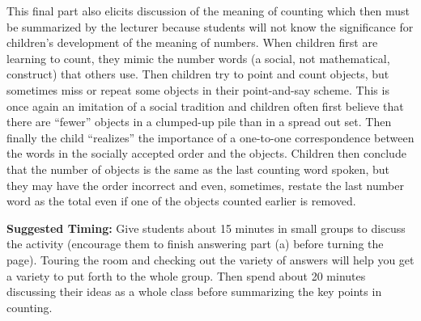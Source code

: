 \documentclass{ximera}
\begin{document}
\begin{instructorNotes}
This final part also elicits discussion of the meaning of counting which then must be summarized by the lecturer because students will not know the significance for children's development of the meaning of numbers.  When children first are learning to count, they mimic the number words (a social, not mathematical, construct) that others use.  Then children try to point and count objects, but sometimes miss or repeat some objects in their point-and-say scheme.  This is once again an imitation of a social tradition and children often first believe that there are ``fewer'' objects in a clumped-up pile than in a spread out set.  Then finally the child ``realizes'' the importance of a one-to-one correspondence between the words in the socially accepted order and the objects.  Children then conclude that the number of objects is the same as the last counting word spoken, but they may have the order incorrect and even, sometimes, restate the last number word as the total even if one of the objects counted earlier is removed.


{\bf Suggested Timing:} Give students about 15 minutes in small groups to discuss the activity (encourage them to finish answering part (a) before turning the page).  Touring the room and checking out the variety of answers will help you get a variety to put forth to the whole group.  Then spend about 20 minutes discussing their ideas as a whole class before summarizing the key points in counting.  



\end{instructorNotes}
\end{document}
